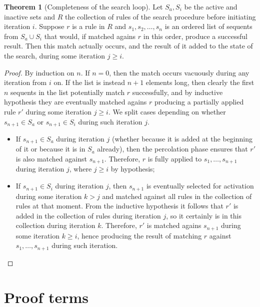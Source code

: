 \documentclass{article}
\theoremstyle{definition}
\newtheorem{theorem}{Theorem}
\begin{document}
\begin{theorem}[Completeness of the search loop]
  Let $S_a, S_i$ be the active and inactive sets and $R$ the collection of rules
  of the search procedure before initiating iteration $i$. Suppose $r$ is a rule
  in $R$ and $s_1, s_2, \dots, s_n$ is an ordered list of sequents from
  $S_a \cup S_i$ that would, if matched agains $r$ in this order, produce a
  successful result. Then this match actually occurs, and the result of it added
  to the state of the search, during some iteration $j \geq i$.
\end{theorem}
\begin{proof}
  By induction on $n$. If $n = 0$, then the match occurs vacuously during any
  iteration from $i$ on. If the list is instead $n+1$ elements long, then
  clearly the first $n$ sequents in the list potentially match $r$ successfully,
  and by inductive hypothesis they are eventually matched agains $r$ producing a
  partially applied rule $r'$ during some iteration $j \geq i$. We split cases
  depending on whether $s_{n+1} \in S_a$ or $s_{n+1} \in S_i$ during such
  iteration $j$.

  \begin{itemize}
  \item If $s_{n+1} \in S_a$ during iteration $j$ (whether because it is added
    at the beginning of it or because it is in $S_a$ already), then the
    percolation phase ensures that $r'$ is also matched against
    $s_{n+1}$. Therefore, $r$ is fully applied to $s_1, \dots, s_{n+1}$ during
    iteration $j$, where $j \geq i$ by hypothesis;
    
  \item If $s_{n+1} \in S_i$ during iteration $j$, then $s_{n+1}$ is eventually
    selected for activation during some iteration $k > j$ and matched against
    all rules in the collection of rules at that moment. From the inductive
    hypothesis it follows that $r'$ is added in the collection of rules during
    iteration $j$, so it certainly is in this collection during iteration
    $k$. Therefore, $r'$ is matched agains $s_{n+1}$ during some iteration
    $k \geq i$, hence producing the result of matching $r$ against
    $s_1, \dots, s_{n+1}$ during such iteration.
  \end{itemize}
\end{proof}

% 

\section{Proof terms}
\end{document}
